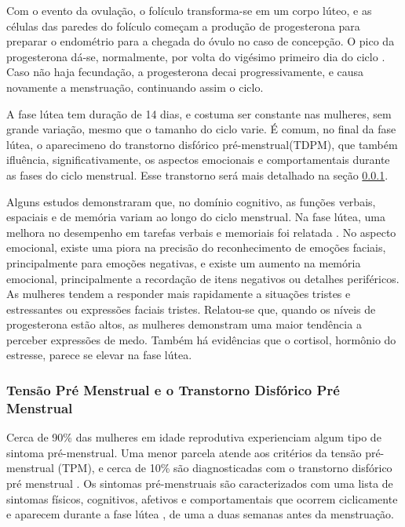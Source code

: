 Com o evento da ovulação, o folículo transforma-se em um corpo lúteo, e as 
células das paredes do folículo começam a produção de progesterona para 
preparar o endométrio para a chegada do óvulo no caso de concepção. 
O pico da progesterona dá-se, normalmente, por volta do vigésimo primeiro 
dia do ciclo \cite{nikas2003}. Caso não haja fecundação, a progesterona 
decai progressivamente, e causa novamente a menstruação, continuando assim 
o ciclo.

A fase lútea tem duração de 14 dias, e costuma ser constante nas mulheres, 
sem grande variação, mesmo que o tamanho do ciclo varie. É comum, no final 
da fase lútea, o aparecimeno do transtorno disfórico pré-menstrual(TDPM), 
que também ifluência, significativamente, os aspectos emocionais e 
comportamentais durante as fases do ciclo menstrual. Esse transtorno 
será mais detalhado na seção \ref{tpm}.

Alguns estudos demonstraram que, no domínio cognitivo, as funções verbais, 
espaciais e de memória variam ao longo do ciclo menstrual. Na fase lútea, 
uma melhora no desempenho em tarefas verbais e memoriais foi relatada 
\cite{hausmann2000}. No aspecto emocional, existe uma piora na precisão 
do reconhecimento de emoções faciais, principalmente para emoções negativas, 
e existe um aumento na memória emocional, principalmente a recordação de 
itens negativos ou detalhes periféricos. As mulheres tendem a responder 
mais rapidamente a situações tristes e estressantes ou expressões faciais 
tristes. Relatou-se que, quando os níveis de progesterona estão altos, as 
mulheres demonstram uma maior tendência a perceber expressões de medo. 
Também há evidências que o cortisol, hormônio do estresse, parece se elevar 
na fase lútea\cite{kirschbaum1999}.

\subsubsection{Tensão Pré Menstrual e o Transtorno Disfórico Pré Menstrual}
\label{tpm}

Cerca de 90\% das mulheres em idade reprodutiva experienciam algum tipo de 
sintoma pré-menstrual. Uma menor parcela atende aos critérios da tensão 
pré-menstrual (TPM), e cerca de 10\% são diagnosticadas com o transtorno 
disfórico pré menstrual \cite{mishell2005}. Os sintomas pré-menstruais 
são caracterizados com uma lista de sintomas físicos, cognitivos, 
afetivos e comportamentais que ocorrem ciclicamente e aparecem durante a 
fase lútea \cite{obrien2011}, de uma a duas semanas antes da menstruação. 

